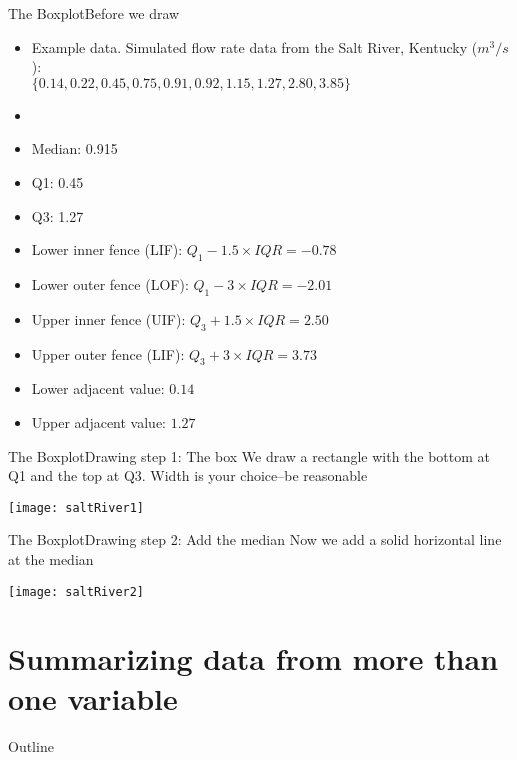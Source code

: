 \documentclass[xcolor=dvipsnames]{beamer}
\begin{document}
\begin{frame}{The Boxplot}{Before we draw}
	\begin{itemize}
		\item Example data. Simulated flow rate data from the Salt River, Kentucky ($m^3 / s$): \\
		$\{0.14, 0.22, 0.45, 0.75, 0.91, 0.92, 1.15, 1.27, 2.80, 3.85\}$
		\item[]
		\item Median: 0.915
		\item Q1: 0.45
		\item Q3: 1.27
		\item Lower inner fence (LIF): $Q_1 - 1.5 \times IQR = -0.78 $
		\item Lower outer fence (LOF): $Q_1 - 3 \times IQR = -2.01$
		\item Upper inner fence (UIF): $Q_3 + 1.5 \times IQR = 2.50 $
		\item Upper outer fence (LIF): $Q_3 + 3 \times IQR = 3.73 $
		\item Lower adjacent value: $0.14$
		\item Upper adjacent value: $1.27$
	\end{itemize}
\end{frame}

\begin{frame}{The Boxplot}{Drawing step 1: The box}
	We draw a rectangle with the bottom at Q1 and the top at Q3. Width is your choice--be reasonable 
	\begin{center}
		\texttt{[image: saltRiver1]}
	\end{center}
\end{frame}

\begin{frame}{The Boxplot}{Drawing step 2: Add the median}
	Now we add a solid horizontal line at the median
	\begin{center}
		\texttt{[image: saltRiver2]}
	\end{center}
\end{frame}

\section{Summarizing data from more than one variable }
\begin{frame}{Outline}
	\tableofcontents[currentsection,subsectionstyle=show/shaded/hide]
\end{frame}
\end{document}
